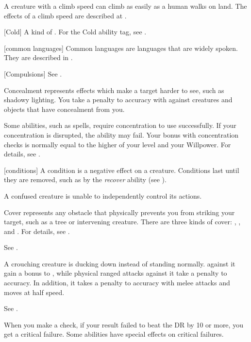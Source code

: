  A creature with a climb speed can climb as easily as a human walks on land.
The effects of a climb speed are described at .

[Cold] A kind of . For the Cold ability tag, see .

[common languages] Common languages are languages that are widely spoken.
They are described in .

[Compulsions] See .

 Concealment represents effects which make a target harder to see, such as shadowy lighting.
You take a  penalty to accuracy with  against creatures and objects that have concealment from you.

 Some abilities, such as spells, require concentration to use successfully.
If your concentration is disrupted, the ability may fail.
Your bonus with concentration checks is normally equal to the higher of your level and your Willpower.
For details, see .

[conditions] A condition is a negative effect on a creature.
Conditions last until they are removed, such as by the \textit{recover} ability (see ).

 A confused creature is unable to independently control its actions. \confusionexplanation

 Cover represents any obstacle that physically prevents you from striking your target, such as a tree or intervening creature.
There are three kinds of cover: , , and .
For details, see .

 See .

 A crouching creature is ducking down instead of standing normally.
 against it gain a  bonus to , while physical ranged attacks against it take a  penalty to accuracy.
In addition, it takes a  penalty to accuracy with melee attacks and moves at half speed.

 See .

 When you make a check, if your result failed to beat the DR by 10 or more, you get a critical failure.
Some abilities have special effects on critical failures.


